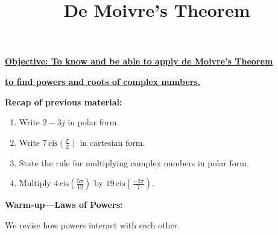 \documentclass{article}
\newcommand{\cis}{\,\mathrm{cis}}
\begin{document}
\title{De Moivre's Theorem}
\date{}

\maketitle
\thispagestyle{empty}

\Large

\textbf{\underline{Objective: To know and be able to apply de Moivre's Theorem}}

\textbf{\underline{to find powers and roots of complex numbers.}}

\vspace{5mm}


{\bf Recap of previous material:}

\vspace{5mm}

\begin{enumerate}
\item Write $2-3j$ in polar form.
\item Write $7\cis\left(\frac{\pi}{2}\right)$ in cartesian form.
\item State the rule for multiplying complex numbers in polar form.
\item Multiply $4\cis\left(\frac{5\pi}{12}\right)$ by $19\cis\left(\frac{-2\pi}{7}\right)$.
\end{enumerate}


\clearpage

{\bf Warm-up---Laws of Powers:}

\vspace{5mm}

We revise how powers interact with each other.
\end{document}
